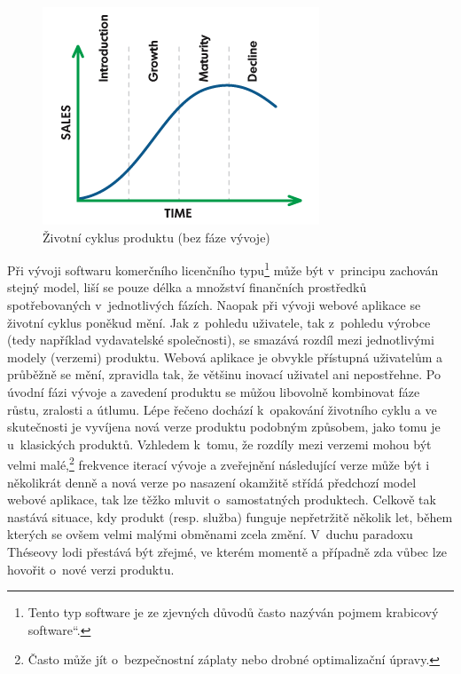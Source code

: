 \documentclass[12pt,oneside,openany]{fithesis}
\begin{document}
\begin{figure}[hbt]
    \hypertarget{fig-product-lifecycle}{}%
    \begin{center}

        
        \includegraphics[]{img/product-lifecycle-simple}
        \caption[{Životní cyklus produktu}]{Životní cyklus produktu (bez fáze vývoje) \cite{product-lifecycle-graph}}
        \label{fig-product-lifecycle}
    \end{center}
\end{figure}

Při vývoji softwaru komerčního licenčního 
typu\footnote{
    Tento typ software je ze zjevných důvodů často nazýván pojmem \glqq 
krabicový software\textquotedblleft{}.}
může být v~principu 
zachován stejný model, liší se pouze délka a množství finančních 
prostředků spotřebovaných v~jednotlivých fázích. Naopak při vývoji 
webové aplikace se životní cyklus poněkud mění. Jak z~pohledu uživatele, 
tak z~pohledu výrobce (tedy například vydavatelské společnosti), se 
smazává rozdíl mezi jednotlivými modely (verzemi) produktu. Webová 
aplikace je obvykle přístupná uživatelům a průběžně se mění, 
zpravidla tak, že většinu inovací uživatel ani nepostřehne. Po úvodní 
fázi vývoje a zavedení produktu se můžou libovolně kombinovat fáze 
růstu, zralosti a útlumu. Lépe řečeno dochází k~opakování životního 
cyklu a ve skutečnosti je vyvíjena nová verze produktu podobným způsobem, 
jako tomu je u~klasických produktů. Vzhledem k~tomu, že rozdíly mezi 
verzemi mohou být velmi 
malé,\footnote{
    Často může jít o~bezpečnostní záplaty nebo drobné optimalizační 
úpravy.
} frekvence iterací 
vývoje a zveřejnění následující verze může být i několikrát denně 
a nová verze po nasazení okamžitě střídá předchozí model webové 
aplikace, tak lze těžko mluvit o~samostatných produktech. Celkově tak 
nastává situace, kdy produkt (resp. služba) funguje nepřetržitě několik 
let, během kterých se ovšem velmi malými obměnami zcela změní. V~duchu 
paradoxu Théseovy lodi přestává být zřejmé, ve kterém momentě a 
případně zda vůbec lze hovořit o~nové verzi produktu. 
\cite{theseus-paradox}{}
\end{document}
